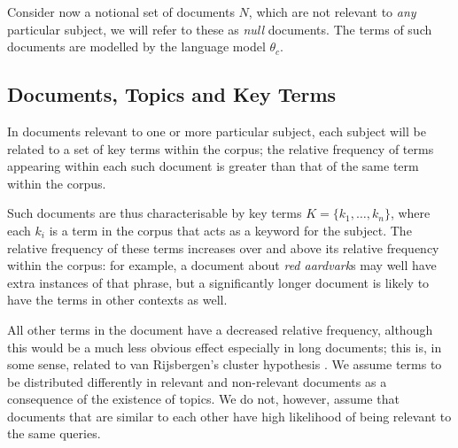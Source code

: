 Consider now a notional set of documents $N$, which are not relevant to \emph{any} particular subject, we will refer to these as \emph{null} documents.  The terms of such documents are modelled by the language model $\theta_c$.

\subsection{Documents, Topics and Key Terms}
In documents relevant to one or more particular subject, each subject will be related to a set of key terms within the corpus; the relative frequency of terms appearing within each such document is greater than that of the same term within the corpus.

Such documents are thus characterisable by key terms $K = \{k_1, \ldots, k_n \}$, where each $k_i$ is a term in the corpus that acts as a keyword for the subject. The relative frequency of these terms increases over and above its relative frequency within the corpus: for example, a document about \emph{red aardvark}s may well have extra instances of that phrase, but a significantly longer document is likely to have the terms in other contexts as well.

All other terms in the document have a decreased relative frequency, although this would be a much less obvious effect especially in long documents; this is, in some sense, related to van Rijsbergen's cluster hypothesis \cite{rijsbergen:1979}. We assume terms to be distributed differently in relevant and non-relevant documents as a consequence of the existence of topics. We do not, however, assume that documents that are similar to each other have high likelihood of being relevant to the same queries. 
